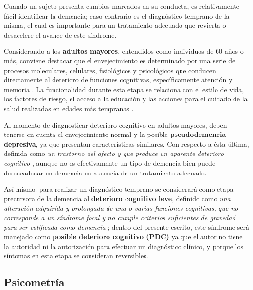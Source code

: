 Cuando un sujeto presenta cambios marcados en su conducta, es relativamente fácil identificar la 
demencia; caso contrario es el diagnóstico temprano de la misma, el cual es importante para un 
tratamiento adecuado que revierta o desacelere el avance de este síndrome.

Considerando a los \textbf{adultos mayores}, entendidos como individuos de 60 años o más, conviene 
destacar que el envejecimiento es determinado por una serie de procesos moleculares, celulares, 
fisiológicos y psicológicos que conducen directamente al deterioro de funciones cognitivas, 
específicamente atención y memoria \cite{Park09}.
La funcionalidad durante esta etapa se relaciona con el estilo de vida, los factores de riesgo, el 
acceso a la educación y las acciones para el cuidado de la salud realizadas en edades más 
tempranas \cite{Sanhueza14}.

Al momento de diagnosticar deterioro cognitivo en adultos mayores, deben tenerse en cuenta el 
envejecimiento normal y la posible \textbf{pseudodemencia depresiva}, ya que presentan 
características similares. Con respecto a ésta última, definida como \textit{un trastorno del 
afecto y que produce un aparente deterioro cognitivo} \cite{DCM5}, aunque no es efectivamente un 
tipo de demencia bien puede desencadenar en demencia en ausencia de un tratamiento adecuado.

Así mismo, para realizar un diagnóstico temprano
se considerará como etapa precursora de la demencia al \textbf{deterioro cognitivo 
leve}, definido como \textit{una alteración adquirida y prolongada de 
una o varias funciones cognitivas, que no corresponde a un síndrome focal y no cumple criterios 
suficientes de gravedad para ser calificada como demencia} \cite{Robles02};
dentro del presente escrito, este síndrome será manejado como \textbf{posible deterioro 
cognitivo (PDC)} ya que el autor no tiene la autoridad ni la autorización para efectuar un 
diagnóstico clínico, y porque los síntomas en esta etapa se consideran %
reversibles.


\subsection{Psicometría}

